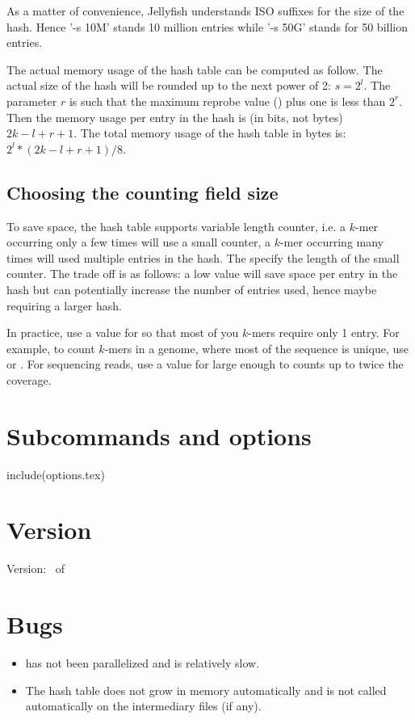 \documentclass[english]{article}
\begin{document}
As a matter of convenience, Jellyfish understands ISO suffixes for the
size of the hash. Hence '-s 10M' stands 10 million entries while '-s
50G' stands for 50 billion entries.

The actual memory usage of the hash table can be computed as
follow. The actual size of the hash will be rounded up to the next
power of 2: $s=2^l$. The parameter $r$ is such that the maximum
reprobe value () plus one is less than $2^r$. Then the memory usage per
entry in the hash is (in bits, not bytes) $2k-l+r+1$. The total memory
usage of the hash table in bytes is: $2^l*(2k-l+r+1)/8$.

\subsection{Choosing the counting field size}
To save space, the hash table supports variable length counter, i.e. a
$k$-mer occurring only a few times will use a small counter, a $k$-mer
occurring many times will used multiple entries in the hash. The
 specify the length of the small counter. The trade off is as
follows: a low value will save space per entry in the hash but can
potentially increase the number of entries used, hence maybe requiring
a larger hash.

In practice, use a value for  so that most of you $k$-mers
require only 1 entry. For example, to count $k$-mers in a genome,
where most of the sequence is unique, use  or
. For sequencing reads, use a value for  large
enough to counts up to twice the coverage.



\section{Subcommands and options}
include(options.tex)

\section{Version}

Version: \Version\ of \Date

\section{Bugs}

\begin{itemize}
\item {} has not been parallelized and is
  relatively slow.
\item The hash table does not grow in memory automatically and
   is not called automatically on the
  intermediary files (if any).
\end{itemize}
\end{document}
